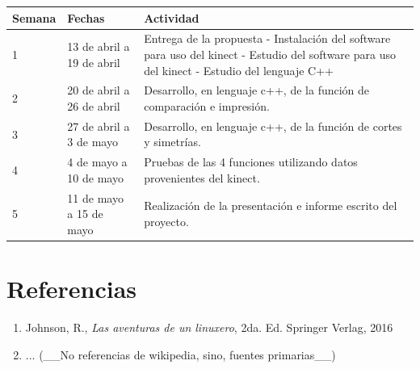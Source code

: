 \documentclass[letterpaper]{article}
\begin{document}
\begin{table}[h]
\begin{tabular}{l l l}
\toprule

\textbf{Semana} & \textbf{Fechas} & \textbf{Actividad}\\

\midrule
1 & 13 de abril a 19 de abril & Entrega de la propuesta - Instalación del
software para uso del kinect -
 Estudio del software para uso del kinect -
Estudio del lenguaje C++ \\
2 & 20 de abril a 26 de abril & Desarrollo, en lenguaje c++, de la función
de comparación e impresión. \\
3 & 27 de abril a 3 de mayo & Desarrollo, en lenguaje c++, de la función
de cortes y simetrías. \\
4 & 4 de mayo a 10 de mayo & Pruebas de las 4 funciones utilizando datos
provenientes del kinect. \\
5 & 11 de mayo a 15 de mayo & Realización de la presentación e informe
escrito del proyecto. \\
\bottomrule
\end{tabular}
\end{table}

\section{Referencias}

\begin{enumerate}
\item Johnson, R., \textit{Las aventuras de un linuxero}, 2da. Ed. Springer Verlag, 2016
\item ... (\_\_No referencias de wikipedia, sino, fuentes primarias\_\_)
\end{enumerate}
	
\end{document}
